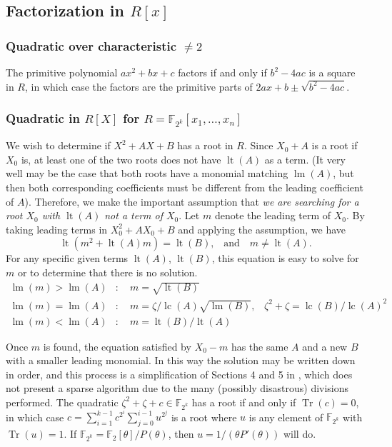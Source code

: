 \documentclass[11pt,reqno]{amsart}
\numberwithin{equation}{section}
\begin{document}
\subsection{Factorization in $R[x]$}
\subsubsection{Quadratic over characteristic $\ne 2$}
The primitive polynomial $ax^2+bx+c$ factors if and only if $b^2-4ac$ is a
square in $R$, in which case the factors are the primitive parts of $2ax+b\pm
\sqrt{b^2-4ac}$.

\subsubsection{Quadratic in $R[X]$ for $R=\mathbb{F}_{2^k}[x_1,\dots,x_n]$}

We wish to determine if $X^2+AX+B$ has a root in $R$. Since $X_0+A$ is a root
if $X_0$ is, at least one of the two roots does not have $\operatorname{lt}(A)$
as a term. (It very well may be the case that both roots have a monomial
matching $\operatorname{lm}(A)$, but then both corresponding coefficients must
be different from the leading coefficient of $A$). Therefore, we make the
important assumption that \emph{we are searching for a root $X_0$ with
$\operatorname{lt}(A)$ not a term of $X_0$}. Let $m$ denote the leading term of
$X_0$. By taking leading terms in $X_0^2+AX_0+B$ and applying the assumption,
we have
\begin{equation*}
\operatorname{lt}(m^2+\operatorname{lt}(A)m) = \operatorname{lt}(B)\text{,}
\quad \text{and} \quad m \neq \operatorname{lt}(A)\text{.}
\end{equation*}
For any specific given terms $\operatorname{lt}(A)$, $\operatorname{lt}(B)$,
this equation is easy to solve for $m$ or to determine that there is no
solution.
\begin{align*}
\operatorname{lm}(m)>\operatorname{lm}(A)&: \quad m =
\sqrt{\operatorname{lt}(B)}\\
\operatorname{lm}(m)=\operatorname{lm}(A)&: \quad m = \zeta
/\operatorname{lc}(A)\sqrt{\operatorname{lm}(B)}\text{,} \quad \zeta^2+\zeta
=\operatorname{lc}(B)/\operatorname{lc}(A)^2\\
\operatorname{lm}(m)<\operatorname{lm}(A)&: \quad m =
\operatorname{lt}(B)/\operatorname{lt}(A)
\end{align*}

Once $m$ is found, the equation satisfied by $X_0-m$ has the same $A$ and a new
$B$ with a smaller leading monomial. In this way the solution may be written
down in order, and this process is a simplification of Sections 4 and 5 in
\cite{QuadraticFactor}, which does not present a sparse algorithm due to the
many (possibly disastrous) divisions performed. The quadratic $\zeta^2+\zeta+c
\in \mathbb{F}_{2^k}$ has a root if and only if $\operatorname{Tr}(c)=0$, in
which case $c=\sum_{i=1}^{k-1}c^{2^i}\sum_{j=0}^{i-1}u^{2^j}$ is a root where
$u$ is any element of $\mathbb{F}_{2^k}$ with $\operatorname{Tr}(u)=1$. If
$\mathbb{F}_{2^k} = \mathbb{F}_2[\theta]/P(\theta)$, then $u=1/(\theta
P'(\theta))$ will do.
\end{document}
